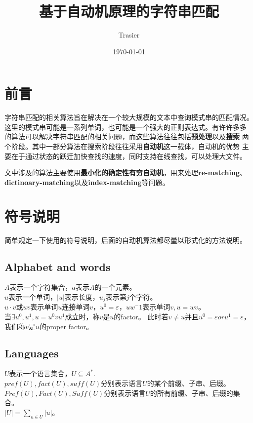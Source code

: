 \documentclass[UTF8]{ctexart}
\theoremstyle{definition}
\theoremstyle{remark}
\numberwithin{equation}{subsection}
\newcommand\Emph{\textbf}
\begin{document}
\title{\Huge 基于自动机原理的字符串匹配}
\vspace{2cm}
\author{\Large Trasier}
\date{\today}
\maketitle


\section{前言}

	字符串匹配的相关算法旨在解决在一个较大规模的文本中查询模式串的匹配情况。
	这里的模式串可能是一系列单词，也可能是一个强大的正则表达式。有许许多多
	的算法可以解决字符串匹配的相关问题，而这些算法往往包括\Emph{预处理}以及\Emph{搜索}
	两个阶段。其中一部分算法在搜索阶段往往采用\Emph{自动机}这一载体，自动机的优势
	主要在于通过状态的跃迁加快查找的速度，同时支持在线查找，可以处理大文件。
	
	文中涉及的算法主要使用\Emph{最小化的确定性有穷自动机}，用来处理\Emph{re-matching}、
    \Emph{dictinoary-matching}以及\Emph{index-matching}等问题。

\section{符号说明}
	
	简单规定一下使用的符号说明，后面的自动机算法都尽量以形式化的方法说明。
	
\subsection{Alphabet and words}
	
	\noindent
    $A$表示一个字符集合，$a$表示$A$的一个元素。				\\
	$u$表示一个单词，$|u|$表示长度，$u_j$表示第$j$个字符。	\\
	$u \cdot v$或$uv$表示单词$u$连接单词$v$，$u^0 = \varepsilon$，$uw^-1$表示单词$v, u=wv$。\\
	当$\exists u^0, u^1, u=u^0vu^1$成立时，称$v$是$u$的factor。
	此时若$v \neq u$并且$u^0=\varepsilon or u^1=\varepsilon$，我们称$v$是$u$的proper factor。
	
\subsection{Languages}
	
	\noindent
	$U$表示一个语言集合，$U \subseteq A^*$.	\\
	$pref(U), fact(U), suff(U)$分别表示语言$U$的某个前缀、子串、后缀。	\\
	$Pref(U), Fact(U), Suff(U)$分别表示语言$U$的所有前缀、子串、后缀的集合。	\\
	$|U| = \sum_{u \in U} |u|$。
	
\end{document}
